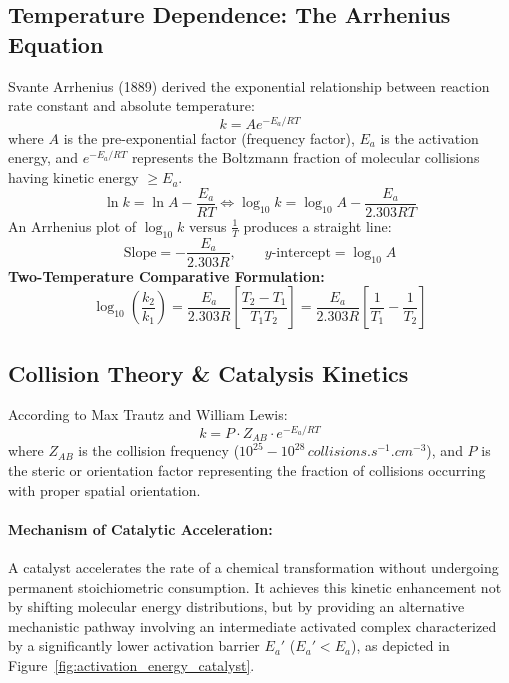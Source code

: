 \documentclass[10pt,twoside,openright]{book}
\begin{document}
\subsection{Temperature Dependence: The Arrhenius Equation}
Svante Arrhenius (1889) derived the exponential relationship between reaction rate constant and absolute temperature:
\begin{equation}
  k = A e^{-E_a / R T}
\end{equation}
where $A$ is the pre-exponential factor (frequency factor), $E_a$ is the activation energy, and $e^{-E_a / R T}$ represents the Boltzmann fraction of molecular collisions having kinetic energy $\ge E_a$.
\begin{equation}
  \ln k = \ln A - \frac{E_a}{R T} \iff \log_{10} k = \log_{10} A - \frac{E_a}{2.303 R T}
\end{equation}
An Arrhenius plot of $\log_{10} k$ versus $\frac{1}{T}$ produces a straight line:
\begin{equation}
  \text{Slope} = -\frac{E_a}{2.303 R}, \qquad y\text{-intercept} = \log_{10} A
\end{equation}
\textbf{Two-Temperature Comparative Formulation:}
\begin{equation}
  \log_{10}\left(\frac{k_2}{k_1}\right) = \frac{E_a}{2.303 R}\left[\frac{T_2 - T_1}{T_1 T_2}\right] = \frac{E_a}{2.303 R}\left[\frac{1}{T_1} - \frac{1}{T_2}\right]
\end{equation}

\subsection{Collision Theory \& Catalysis Kinetics}
According to Max Trautz and William Lewis:
\begin{equation}
  k = P \cdot Z_{AB} \cdot e^{-E_a / R T}
\end{equation}
where $Z_{AB}$ is the collision frequency ($10^{25} - 10^{28}\,\si{collisions.s^{-1}.cm^{-3}}$), and $P$ is the steric or orientation factor representing the fraction of collisions occurring with proper spatial orientation.

\paragraph{Mechanism of Catalytic Acceleration:}
A catalyst accelerates the rate of a chemical transformation without undergoing permanent stoichiometric consumption. It achieves this kinetic enhancement not by shifting molecular energy distributions, but by providing an alternative mechanistic pathway involving an intermediate activated complex characterized by a significantly lower activation barrier $E_a'$ ($E_a' < E_a$), as depicted in Figure~\ref{fig:activation_energy_catalyst}.
\end{document}
